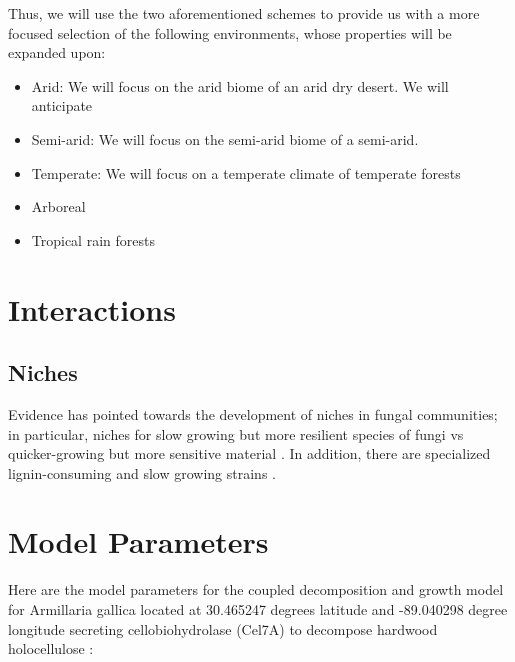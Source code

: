 \documentclass{article}
\begin{document}
Thus, we will use the two aforementioned schemes to provide us with a more focused selection of the following environments, whose properties will be expanded upon:
\begin{itemize}
\item Arid: We will focus on the arid biome of an arid dry desert. We will anticipate

\item Semi-arid: We will focus on the semi-arid biome of a semi-arid. 

\item Temperate: We will focus on a temperate climate of temperate forests

\item Arboreal

\item Tropical rain forests

\end{itemize}

\section{Interactions}

\subsection{Niches}

Evidence has pointed towards the development of niches in fungal communities; in particular, niches for slow growing but more resilient species of fungi vs quicker-growing but more sensitive material \cite{GUIDE ONE****}. In addition, there are specialized lignin-consuming and slow growing strains \cite{Moorhead2006}. 

\newpage
\section{Model Parameters}

Here are the model parameters for the coupled decomposition and growth model for Armillaria gallica located at 30.465247 degrees latitude and -89.040298 degree longitude secreting cellobiohydrolase (Cel7A) to decompose hardwood holocellulose \cite{Maynard2019} \cite{Kari2014}:
\end{document}
